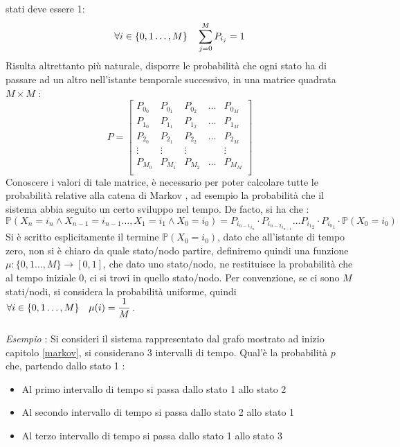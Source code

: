 \documentclass[12pt, letterpaper]{article}
\newcommand{\acc}{\\\hphantom{}\\}
\newcommand{\Prob}{{\mathbb P}}
\newcommand{\spaz}{{\text{\hphantom{aa}}}}
\begin{document}
stati deve essere 1: $$\forall i\in \{0,1\dots,M\}\spaz \sum_{j=0}^MP_{i_j}=1$$
Risulta altrettanto più naturale, disporre le probabilità che ogni stato ha di passare ad un altro nell'istante temporale 
successivo, in una matrice quadrata \(M\times M\) :
$$P=\begin{bmatrix}
    P_{0_0}& P_{0_1}& P_{0_2}&\dots&P_{0_M}\\
    P_{1_0}& P_{1_1}& P_{1_2}&\dots&P_{1_M}\\
    P_{2_0}& P_{2_1}& P_{2_2}&\dots&P_{2_M}\\
    \vdots &\vdots &\vdots &&\vdots \\
    P_{M_0}& P_{M_1}& P_{M_2}&\dots&P_{M_M}\\
\end{bmatrix}$$
Conoscere i valori di tale matrice, è necessario per poter calcolare tutte le probabilità relative alla catena di Markov 
, ad esempio la probabilità che il sistema abbia seguito un certo sviluppo nel tempo. De facto, si ha che : 
$$\Prob(X_n=i_n\land X_{n-1}=i_{n-1}\dots,X_{1}=i_1\land X_0=i_0)=P_{{i_{n-1}}_{i_{n}}}\cdot P_{{i_{n-2}}_{i_{n-1}}}
\dots P_{{i_{1}}_{2}}\cdot P_{{i_{0}}_{1}}\cdot \Prob(X_0=i_0)$$
Si è scritto esplicitamente il termine \(\Prob(X_0=i_0)\), dato che all'istante di tempo zero, non si è chiaro 
da quale stato/nodo partire, definiremo quindi una funzione \(\mu:\{0,1\dots,M\}\rightarrow[0,1]\), che dato uno stato/nodo, 
ne restituisce la probabilità che al tempo iniziale 0, ci si trovi in quello stato/nodo. Per convenzione, se ci sono 
\(M\) stati/nodi, si considera la probabilità uniforme, quindi \(\forall i \in \{0,1\dots,M\}\spaz \mu(i)=\dfrac{1}{M}\).
\acc
\textit{Esempio} : Si consideri il sistema rappresentato dal grafo mostrato ad inizio capitolo \ref{markov}, si considerano 
3 intervalli di tempo. Qual'è la probabilità \(p\) che, partendo dallo stato 1 : \begin{itemize}
    \item Al primo intervallo di tempo si passa dallo stato 1 allo stato 2
    \item Al secondo intervallo di tempo si passa dallo stato 2 allo stato 1
    \item Al terzo intervallo di tempo si passa dallo stato 1 allo stato 3
\end{itemize}
\begin{figure}[h]
\end{figure}
\end{document}
